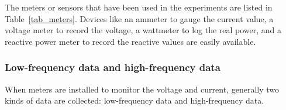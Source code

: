 

The meters or sensors that have been used in the experiments
are listed in Table~\ref{tab_meters}. 
Devices like an ammeter to gauge the current value, a voltage meter to record the voltage,
a wattmeter to log the real power, and a reactive power meter to record the reactive values 
are easily available.


\subsubsection{Low-frequency data and high-frequency data}

When meters are installed to monitor the voltage and current,
generally two kinds of data are collected:
low-frequency data and high-frequency data.

